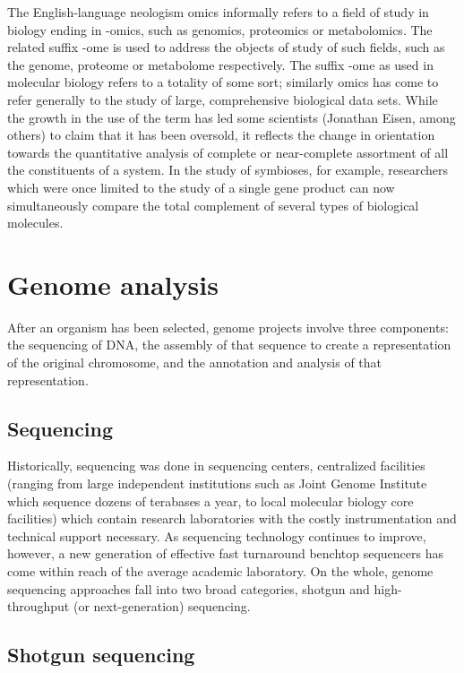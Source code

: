 The English-language neologism omics informally refers to a field of study in biology ending in -omics, such as genomics, proteomics or metabolomics. The related suffix -ome is used to address the objects of study of such fields, such as the genome, proteome or metabolome respectively. The suffix -ome as used in molecular biology refers to a totality of some sort; similarly omics has come to refer generally to the study of large, comprehensive biological data sets. While the growth in the use of the term has led some scientists (Jonathan Eisen, among others) to claim that it has been oversold, it reflects the change in orientation towards the quantitative analysis of complete or near-complete assortment of all the constituents of a system. In the study of symbioses, for example, researchers which were once limited to the study of a single gene product can now simultaneously compare the total complement of several types of biological molecules.

\hypertarget{genome-analysis}{%
\section{Genome analysis}\label{genome-analysis}}

After an organism has been selected, genome projects involve three components: the sequencing of DNA, the assembly of that sequence to create a representation of the original chromosome, and the annotation and analysis of that representation.

\hypertarget{sequencing}{%
\subsection{Sequencing}\label{sequencing}}

Historically, sequencing was done in sequencing centers, centralized facilities (ranging from large independent institutions such as Joint Genome Institute which sequence dozens of terabases a year, to local molecular biology core facilities) which contain research laboratories with the costly instrumentation and technical support necessary. As sequencing technology continues to improve, however, a new generation of effective fast turnaround benchtop sequencers has come within reach of the average academic laboratory. On the whole, genome sequencing approaches fall into two broad categories, shotgun and high-throughput (or next-generation) sequencing.

\hypertarget{shotgun-sequencing}{%
\subsection{Shotgun sequencing}\label{shotgun-sequencing}}

